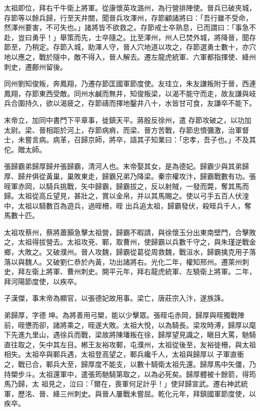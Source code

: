 \begin{pinyinscope}
 太祖即位，拜右千牛衛上將軍。從康懷英攻潞州，為行營排陣使。晉兵已破夾城，存節等以餘兵歸，行至天井關，聞晉兵攻澤州，存節顧諸將曰：「吾行雖不受命，然澤州要害，不可失也。」諸將皆不欲救之。存節戒士卒熟息，已而謂曰：「事急不
 赴，豈曰勇乎！」舉策而先，士卒隨之。比至澤州，州人已焚外城，將降晉，聞存節至，乃稍定。存節入城，助澤人守，晉人穴地道以攻之，存節選勇士數十，亦穴地以應之，戰於隧中，敵不得入，晉人解去。遷左龍虎統軍、六軍都指揮使、絳州刺史，遷鄜州留後。



 同州劉知俊叛，奔鳳翔，乃遷存節匡國軍節度使。友珪立，朱友謙叛附于晉，西連鳳翔，存節東西受敵。同州水鹹而無井，知俊叛梁，以渴不能守而走，故友謙與岐兵合圍持久，欲以渴疲之，存節禱而擇地鑿井八十，水皆甘可食，友謙卒不能下。



 末帝立，加同中書門下平章事，徙鎮天平。蔣殷反徐州，遣
 存節攻破之，以功加太尉。梁、晉相距於河上，存節病痟，而梁、晉方苦戰，存節忠憤彌激，治軍督士，未嘗言病。病革，召歸京師，將卒，語其子知業曰：「忠孝，吾子也。」不及其佗。贈太師。



 張歸霸弟歸厚歸弁張歸霸，清河人也。末帝娶其女，是為德妃。歸霸少與其弟歸厚、歸弁俱從黃巢，巢敗東走，歸霸兄弟乃降梁。秦宗權攻汴，歸霸戰數有功。張晊軍赤岡，以騎兵挑戰，矢中歸霸，歸霸拔之，反以射賊，一發而斃，奪其馬而歸。太祖從高丘望見，甚壯之，賞以金帛，并以其馬賜之。使以弓手五百人伏湟中，太祖以騎數百為遊兵，過晊柵，晊
 出兵追太祖，歸霸發伏，殺晊兵千人，奪馬數十匹。



 太祖攻蔡州，蔡將蕭顥急擊太祖營，歸霸不暇請，與徐懷玉分出東南壁門，合擊敗之，太祖得拔營去。太祖攻兗、鄆，取曹州，使歸霸以兵數千守之，與朱瑾逆戰金鄉，大敗之。又破濮州。晉人攻魏，歸霸從葛從周救魏，戰洹水，歸霸擒克用子落落以與魏人。又破劉仁恭於內黃，功出諸將右。光化二年，權知邢州。遷萊州刺史，拜左衛上將軍、曹州刺史。開平元年，拜右龍虎統軍、左驍衛上將軍。二年，拜河陽節度使，以疾卒。



 子漢傑，事末帝為顯官，以張德妃故用事。梁亡，唐莊宗入汴，遂族誅。



 弟歸厚，字德
 坤。為將善用弓槊，能以少擊眾。張晊屯赤岡，歸厚與晊獨戰陣前，晊憊而卻，諸將乘之，晊遂大敗。太祖大悅，以為騎長。梁攻時溥，歸厚以麾下先進九里山，遇徐兵而戰，梁故將陳璠叛在徐，歸厚望見識之，瞋目大罵，馳騎直往取之，矢中其左目。郴王友裕攻鄆，屯濮州，太祖從後至，友裕徙柵，與太祖相失。太祖卒與鄆兵遇，太祖登高望之，鄆兵纔千人，太祖與歸厚以子軍直衝之，戰已合，鄆兵大至，歸厚度不能支，以數十騎衛太祖先還。歸厚馬中矢僵，乃持槊步斗。太祖還軍中，遣張筠馳騎第取之，以為必死矣。歸厚體被十餘箭，得筠馬乃歸，太
 祖見之，泣曰：「爾在，喪軍何足計乎！」使舁歸宣武。遷右神武統軍，歷洺、晉、絳三州刺史。與晉人屢戰未嘗屈。乾化元年，拜鎮國軍節度使，以疾卒。




\end{pinyinscope}
